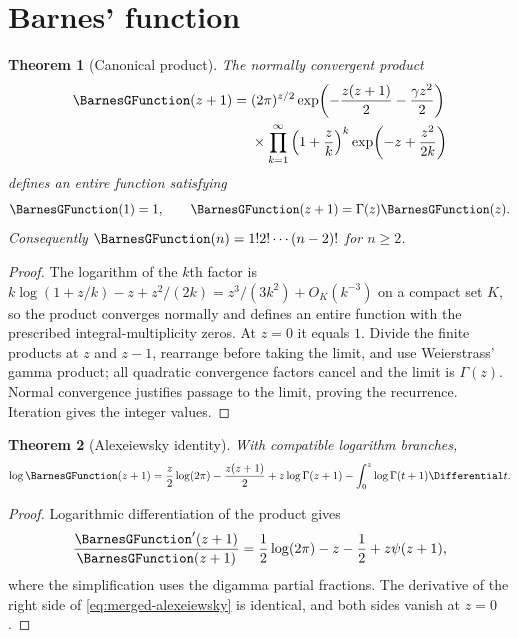 \documentclass[11pt,a4paper,oneside,openany]{book}
\newtheorem{theorem}{Theorem}[chapter]
\theoremstyle{definition}
\theoremstyle{remark}
\begin{document}
\section{Barnes' function}

\begin{theorem}[Canonical product]
\label{thm:merged-barnes-product}
The normally convergent product
\begin{align}
 \BarnesGFunction(z+1)={}&(2\pi)^{z/2}
 \exp\!\left(-\frac{z(z+1)}2-\frac{\gamma z^2}{2}\right)             \notag\\
 &\times\prod_{k=1}^{\infty}\left(1+\frac zk\right)^k
 \exp\!\left(-z+\frac{z^2}{2k}\right)                             \label{eq:merged-barnes-product}
\end{align}
defines an entire function satisfying
\begin{equation}
 \BarnesGFunction(1)=1,\qquad \BarnesGFunction(z+1)=\Gamma(z)\BarnesGFunction(z).                                \label{eq:merged-barnes-recurrence}
\end{equation}
Consequently $\BarnesGFunction(n)=1!2!\cdots(n-2)!$ for $n\geq2$.
\end{theorem}

\begin{proof}
The logarithm of the $k$th factor is
$k\log(1+z/k)-z+z^2/(2k)=z^3/(3k^2)+O_K(k^{-3})$ on a compact set $K$,
so the product converges normally and defines an entire function with the
prescribed integral-multiplicity zeros.  At $z=0$ it equals $1$.  Divide the
finite products at $z$ and $z-1$, rearrange before taking the limit, and use
Weierstrass' gamma product; all quadratic convergence factors cancel and the
limit is $\Gamma(z)$.  Normal convergence justifies passage to the limit,
proving the recurrence.  Iteration gives the integer values.
\end{proof}

\begin{theorem}[Alexeiewsky identity]
\label{thm:merged-alexeiewsky}
With compatible logarithm branches,
\begin{equation}
 \log \BarnesGFunction(z+1)=\frac z2\log(2\pi)-\frac{z(z+1)}2
 +z\log\Gamma(z+1)-\int_0^z\log\Gamma(t+1)\Differential t.                   \label{eq:merged-alexeiewsky}
\end{equation}
\end{theorem}

\begin{proof}
Logarithmic differentiation of the product gives
\[
 \frac{\BarnesGFunction'(z+1)}{\BarnesGFunction(z+1)}
 =\frac12\log(2\pi)-z-\frac12+z\psi(z+1),
\]
where the simplification uses the digamma partial fractions.  The derivative
of the right side of \eqref{eq:merged-alexeiewsky} is identical, and both
sides vanish at $z=0$.
\end{proof}
\end{document}
